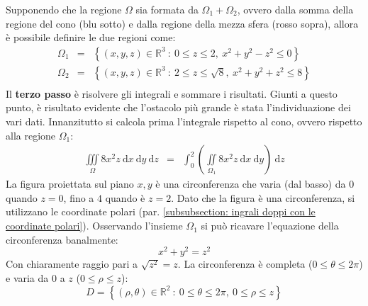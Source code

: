 \documentclass[a4paper]{article}
\begin{document}
	\noindent
	Supponendo che la regione $\Omega$ sia formata da $\Omega_{1} + \Omega_{2}$, ovvero dalla somma della regione del cono (blu sotto) e dalla regione della mezza sfera (rosso sopra), allora è possibile definire le due regioni come:
	\begin{equation*}
		\begin{array}{rcl}
			\Omega_{1} &=& \left\{\left(x,y,z\right) \in \mathbb{R}^{3} \: : \: 0 \le z \le 2, \: x^{2} + y^{2} - z^{2} \le 0\right\} \\ [.5em]
			\Omega_{2} &=& \left\{\left(x,y,z\right) \in \mathbb{R}^{3} \: : \: 2 \le z \le \sqrt{8}, \: x^{2} + y^{2} + z^{2} \le 8\right\} \\ [.5em]
		\end{array}
	\end{equation*}
	Il \textbf{terzo passo} è risolvere gli integrali e sommare i risultati. Giunti a questo punto, è risultato evidente che l'ostacolo più grande è stata l'individuazione dei vari dati. Innanzitutto si calcola prima l'integrale rispetto al cono, ovvero rispetto alla regione $\Omega_{1}$:
	\begin{equation*}
		\begin{array}{rcl}
			\displaystyle\iiint\limits_{\Omega} 8x^{2}z \:\mathrm{d}x\:\mathrm{d}y\:\mathrm{d}z 
			&=& 
			\displaystyle\int_{0}^{2} \left(\iint\limits_{\Omega_{1}}8x^{2}z \:\mathrm{d}x\:\mathrm{d}y\right) \:\mathrm{d}z
		\end{array}
	\end{equation*}
	La figura proiettata sul piano $x,y$ è una circonferenza che varia (dal basso) da $0$ quando $z = 0$, fino a $4$ quando è $z = 2$. Dato che la figura è una circonferenza, si utilizzano le coordinate polari (par. \ref{subsubsection: ingrali doppi con le coordinate polari}). Osservando l'insieme $\Omega_{1}$ si può ricavare l'equazione della circonferenza banalmente:
	\begin{equation*}
		x^{2} + y^{2} = z^{2}
	\end{equation*}
	Con chiaramente raggio pari a $\sqrt{z^{2}} = z$. La circonferenza è completa ($0 \le \theta \le 2\pi$) e varia da $0$ a $z$ ($0 \le \rho \le z$):
	\begin{equation*}
		D = \left\{\left(\rho, \theta\right) \in \mathbb{R}^{2} \: : \: 0 \le \theta \le 2\pi, \: 0 \le \rho \le z\right\}
	\end{equation*}\newpage
\end{document}
